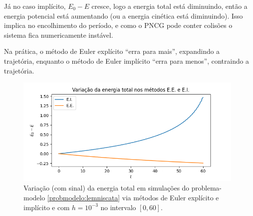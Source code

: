 Já no caso implícito, $E_0-E$ cresce, logo a energia total está diminuindo, então a energia potencial está aumentando (ou a energia cinética está diminuindo). Isso implica no encolhimento do período, e como o PNCG pode conter colisões o sistema fica numericamente instável.

Na prática, o método de Euler explícito ``erra para mais'', expandindo a trajetória, enquanto o método de Euler implícito ``erra para menos'', contraindo a trajetória.

\begin{figure}
        \centering
        \includegraphics[width=0.7\linewidth]{tcc//img/lemniscata_euler_exp_imp.png}
        \caption{Variação (com sinal) da energia total em simulações do problema-modelo \ref{probmodelo:lemniscata} via métodos de Euler explícito e implícito e com $h=10^{-3}$ no intervalo $[0,60]$.}
        \label{fig:lemniscata_euler_exp_imp}
\end{figure}